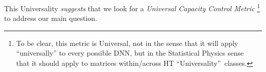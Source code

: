 This Universality \emph{suggests} that we look for a \emph{Universal Capacity Control Metric}%
\footnote{To be clear, this metric is Universal, not in the sense that it will apply ``universally'' to every possible DNN, but in the Statistical Physics sense~\cite{SornetteBook,BouchaudPotters03} that it should apply to matrices within/across HT ``Universality''~classes.}
to address our main question.

